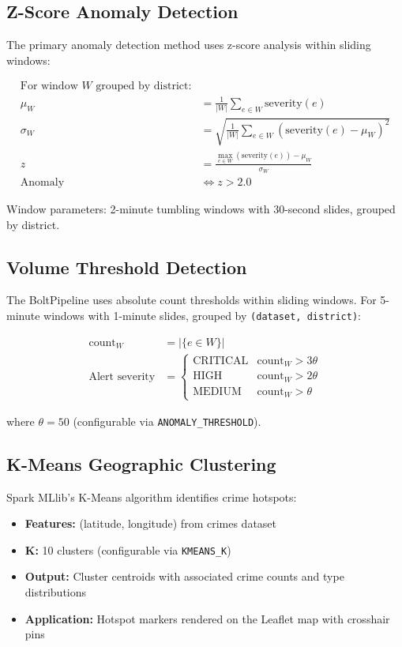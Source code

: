 \documentclass[12pt,a4paper]{article}
\begin{document}
\subsection{Z-Score Anomaly Detection}

The primary anomaly detection method uses z-score analysis within sliding windows:

\begin{align}
\text{For window } W \text{ grouped by district:} \nonumber \\
\mu_W &= \frac{1}{|W|} \sum_{e \in W} \text{severity}(e) \\
\sigma_W &= \sqrt{\frac{1}{|W|} \sum_{e \in W} (\text{severity}(e) - \mu_W)^2} \\
z &= \frac{\max_{e \in W}(\text{severity}(e)) - \mu_W}{\sigma_W} \\
\text{Anomaly} &\iff z > 2.0
\end{align}

Window parameters: 2-minute tumbling windows with 30-second slides, grouped by district.

\subsection{Volume Threshold Detection}

The BoltPipeline uses absolute count thresholds within sliding windows. For 5-minute windows with 1-minute slides, grouped by \texttt{(dataset, district)}:

\begin{align}
\text{count}_W &= |\{e \in W\}| \\
\text{Alert severity} &= \begin{cases}
  \text{CRITICAL} & \text{count}_W > 3\theta \\
  \text{HIGH} & \text{count}_W > 2\theta \\
  \text{MEDIUM} & \text{count}_W > \theta
\end{cases}
\end{align}

where $\theta = 50$ (configurable via \texttt{ANOMALY\_THRESHOLD}).

\subsection{K-Means Geographic Clustering}

Spark MLlib's K-Means algorithm identifies crime hotspots:

\begin{itemize}
  \item \textbf{Features:} (latitude, longitude) from crimes dataset
  \item \textbf{K:} 10 clusters (configurable via \texttt{KMEANS\_K})
  \item \textbf{Output:} Cluster centroids with associated crime counts and type distributions
  \item \textbf{Application:} Hotspot markers rendered on the Leaflet map with crosshair pins
\end{itemize}
\end{document}
